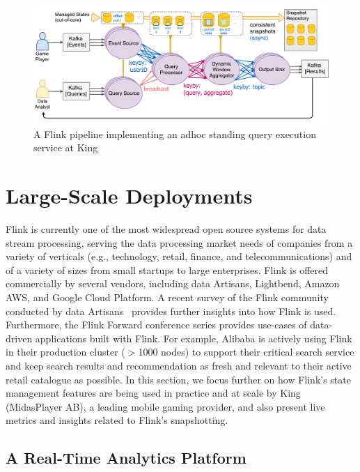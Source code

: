 \begin{figure}[t]
\centering
\includegraphics[width=\textwidth]{figures/rbea.pdf}
\caption{A Flink pipeline implementing an adhoc standing query execution service at King} 
\label{fig:rbea}
\vspace{-4mm}
\end{figure}



\section{Large-Scale Deployments}
\label{sec:evaluation}

Flink is currently one of the most widespread open source systems for data stream processing, serving the data processing market needs of companies from a variety of verticals (e.g., technology, retail, finance, and telecommunications) and of a variety of sizes from small startups to large enterprises. Flink is offered commercially by several vendors, including data Artisans, Lightbend, Amazon AWS, and Google Cloud Platform. A recent survey of the Flink community conducted by data Artisans \cite{CUSTOM:web/dartisanssurvey} provides further insights into how Flink is used. Furthermore, the Flink Forward conference series \cite{CUSTOM:web/flinkforward} provides use-cases of data-driven applications built with Flink. For example, {Alibaba} is actively using Flink in their production cluster ($>$1000 nodes) to support their critical search service \cite{CUSTOM:web/alibaba} and keep search results and recommendation as fresh and relevant to their active retail catalogue as possible. In this section, we focus further on how Flink's state management features are being used in practice and at scale by King (MidasPlayer AB), a leading mobile gaming provider, and also present live metrics and insights related to Flink's snapshotting.

\subsection{A Real-Time Analytics Platform}

